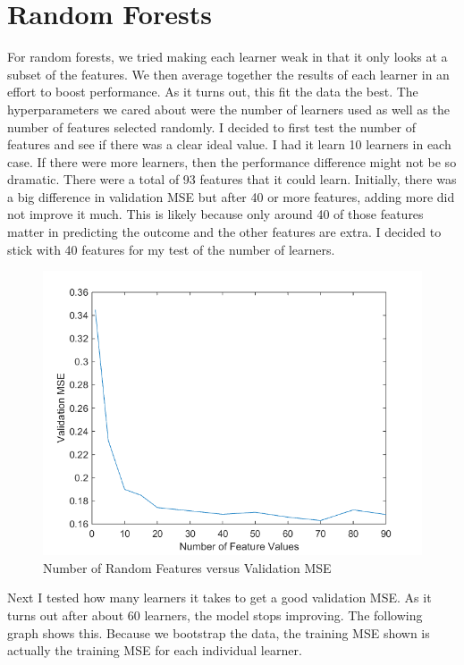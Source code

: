 \documentclass[twoside,11pt]{article}
\theoremstyle{definition}
\begin{document}
\section*{Random Forests}

For random forests, we tried making each learner weak in that it only looks at a subset of the features. We then average together the results of each learner in an effort to boost performance. As it turns out, this fit the data the best. The hyperparameters we cared about were the number of learners used as well as the number of features selected randomly. I decided to first test the number of features and see if there was a clear ideal value. I had it learn 10 learners in each case. If there were more learners, then the performance difference might not be so dramatic. There were a total of 93 features that it could learn. Initially, there was a big difference in validation MSE but after 40 or more features, adding more did not improve it much. This is likely because only around 40 of those features matter in predicting the outcome and the other features are extra. I decided to stick with 40 features for my test of the number of learners. \\

\begin{figure}[h!]
\centering
\includegraphics[width=4 in]{numFeatValuesVersusMSE.png}
\caption{Number of Random Features versus Validation MSE}
\end{figure}

Next I tested how many learners it takes to get a good validation MSE. As it turns out after about 60 learners, the model stops improving. The following graph shows this. Because we bootstrap the data, the training MSE shown is actually the training MSE for each individual learner. 
\end{document}
